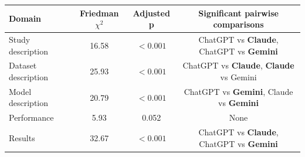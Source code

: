 \begin{tabular}{lccc}
\hline
\textbf{Domain} & \textbf{Friedman $\chi^2$} & \textbf{Adjusted p} & \textbf{Significant pairwise comparisons} \\
\hline
Study description & 16.58 & $<0.001$ & ChatGPT vs \textbf{Claude}, ChatGPT vs \textbf{Gemini} \\
Dataset description & 25.93 & $<0.001$ & ChatGPT vs \textbf{Claude}, \textbf{Claude} vs Gemini \\
Model description & 20.79 & $<0.001$ & ChatGPT vs \textbf{Gemini}, Claude vs \textbf{Gemini} \\
Performance & 5.93 & 0.052 & None \\
Results & 32.67 & $<0.001$ & ChatGPT vs \textbf{Claude}, ChatGPT vs \textbf{Gemini} \\
\hline
\end{tabular}
